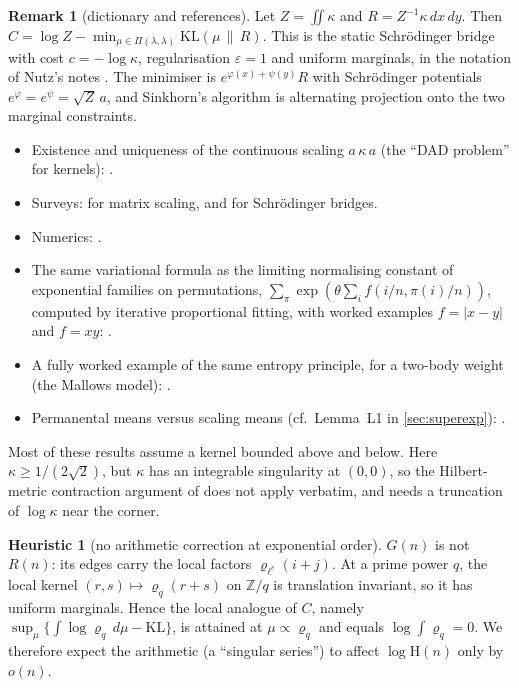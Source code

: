 \documentclass[11pt]{amsart}
\theoremstyle{definition}
\newtheorem{remark}[theorem]{Remark}
\newtheorem{heuristic}[theorem]{Heuristic}
\newcommand{\Ham}{\mathrm{H}}
\newcommand{\KL}{\mathrm{KL}}
\begin{document}
\begin{remark}[dictionary and references]\label{rem:eot}
Let $Z=\iint\kappa$ and $R=Z^{-1}\kappa\,dx\,dy$. Then
$C=\log Z-\min_{\mu\in\Pi(\lambda,\lambda)}\KL(\mu\,\|\,R)$. This is the static
Schr\"odinger bridge with cost $c=-\log\kappa$, regularisation $\varepsilon=1$ and uniform
marginals, in the notation of Nutz's notes \cite{Nutz}. The minimiser is
$e^{\varphi(x)+\psi(y)}R$ with Schr\"odinger potentials $e^\varphi=e^\psi=\sqrt Z\,a$, and
Sinkhorn's algorithm is alternating projection onto the two marginal constraints.
\begin{itemize}
\item Existence and uniqueness of the continuous scaling $a\,\kappa\,a$ (the ``DAD
problem'' for kernels): \cite{BLN,Nussbaum}.
\item Surveys: \cite{Idel} for matrix scaling, and \cite{Leonard,Nutz} for Schr\"odinger bridges.
\item Numerics: \cite{PeyreCuturi}.
\item The same variational formula as the limiting normalising constant of exponential
families on permutations, $\sum_\pi\exp(\theta\sum_i f(i/n,\pi(i)/n))$, computed by
iterative proportional fitting, with worked examples $f=|x-y|$ and $f=xy$:
\cite{Mukherjee,MukherjeeTagami}.
\item A fully worked example of the same entropy principle, for a two-body weight
(the Mallows model): \cite{Starr}.
\item Permanental means versus scaling means (cf.\ Lemma~L1 in \cref{sec:superexp}):
\cite{BochiIommiPonce}.
\end{itemize}
Most of these results assume a kernel bounded above and below. Here
$\kappa\ge1/(2\sqrt2)$, but $\kappa$ has an integrable singularity at $(0,0)$, so the
Hilbert-metric contraction argument of \cite{Nussbaum} does not apply verbatim, and
\cite{Mukherjee} needs a truncation of $\log\kappa$ near the corner.
\end{remark}

\begin{heuristic}[no arithmetic correction at exponential order]
$G(n)$ is not $R(n)$: its edges carry the local factors $\varrho_{\ell^e}(i+j)$. At
a prime power $q$, the local kernel $(r,s)\mapsto\varrho_q(r+s)$ on $\mathbb{Z}/q$ is
translation invariant, so it has uniform marginals. Hence the local analogue of
$C$, namely $\sup_\mu\{\int\log\varrho_q\,d\mu-\KL\}$, is attained at
$\mu\propto\varrho_q$ and equals $\log\int\varrho_q=0$. We therefore expect the
arithmetic (a ``singular series'') to affect $\log\Ham(n)$ only by $o(n)$.
\end{heuristic}
\end{document}
